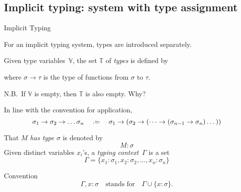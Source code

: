 \subsection{Implicit typing: system with type assignment}
\begin{frame}[allowframebreaks]{Implicit Typing}

For an implicit typing system, types are introduced separately.
\begin{definition}
  Given type variables~$\mathbb{V}$, the set $\mathbb{T}$ of
  \emph{types} is defined by
  \begin{multicols}{2}
    \begin{prooftree}
    \end{prooftree}
    \begin{prooftree}
    \end{prooftree}
  \end{multicols}
  where $\sigma\to\tau$ is the type of functions from $\sigma$ to $\tau$.
\end{definition}
N.B.\ If $\mathbb{V}$ is empty, then $\mathbb{T}$ is also empty. Why?

In line with the convention for application, 
\[
    \sigma_1 \to \sigma_2 \to \dots \sigma_n \quad  \defeq\quad \sigma_1 \to
    (\sigma_2 \to ( \dots \to (\sigma_{n-1} \to \sigma_n)\dots))
  \]
\begin{definition}
  That \alert{\emph{$M$ has type $\sigma$}} is denoted by
      \[
        M : \sigma
      \]
      Given distinct variables $x_i$'s, a \alert{\emph{typing context}}~$\Gamma$
      is a set 
      \[
        \Gamma = \{x_1 : \sigma_1, x_2 : \sigma_2, \ldots, x_n : \sigma_n\}
      \]
  \end{definition}
  \begin{block}{Convention}
      \[
        \Gamma, x : \sigma\quad\text{stands for}\quad\Gamma\cup \{x : \sigma\}.
      \]
  \end{block}


\end{frame}
